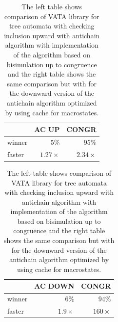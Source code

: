\begin{table}
\begin{center}
\parbox{.45\linewidth}{
  \begin{tabular}[scale=0.3]{ | l | r | r |}
   \hline
    & \textbf{AC UP} & \textbf{CONGR} \\ \hline \hline
    winner & $5\%$ & $95\%$ \\ \hline
    faster & $1.27\times$ & $2.34\times$ \\ \hline
   \end{tabular}
}
   \parbox{.45\linewidth}{
  \begin{tabular}{ | l | r | r |}
   \hline
    & \textbf{AC DOWN} & \textbf{CONGR} \\ \hline \hline
    winner & $6\%$ & $94\%$ \\ \hline
    faster & $1.9\times$ & $160\times$ \\ \hline
   \end{tabular}
   }
   \caption{The left table shows comparison of VATA library for tree automata with checking inclusion upward with antichain algorithm with
       implementation of the algorithm based on bisimulation up to congruence and
   the right table shows the same comparison but with for the downward version of the antichain algorithm optimized by using cache for macrostates.}
   \label{tabAc}
\end{center}
\end{table}

